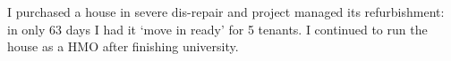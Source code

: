 I purchased a house in severe dis-repair and project managed its refurbishment: in only 63 days I had it `move in ready' for 5 tenants. I continued to run the house as a HMO after finishing university.
\sectionsep{}
